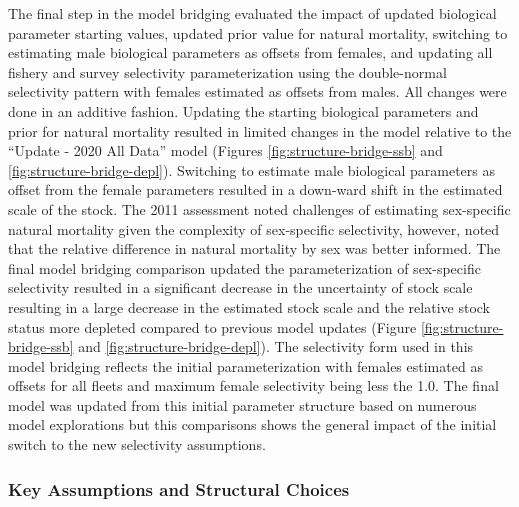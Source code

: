 \documentclass[11pt,
  english,
  a4paper,
]{article}
\begin{document}
The final step in the model bridging evaluated the impact of updated biological parameter starting values, updated prior value for natural mortality, switching to estimating male biological parameters as offsets from females, and updating all fishery and survey selectivity parameterization using the double-normal selectivity pattern with females estimated as offsets from males. All changes were done in an additive fashion. Updating the starting biological parameters and prior for natural mortality resulted in limited changes in the model relative to the ``Update - 2020 All Data'' model (Figures \ref{fig:structure-bridge-ssb} and \ref{fig:structure-bridge-depl}). Switching to estimate male biological parameters as offset from the female parameters resulted in a down-ward shift in the estimated scale of the stock. The 2011 assessment noted challenges of estimating sex-specific natural mortality given the complexity of sex-specific selectivity, however, noted that the relative difference in natural mortality by sex was better informed. The final model bridging comparison updated the parameterization of sex-specific selectivity resulted in a significant decrease in the uncertainty of stock scale resulting in a large decrease in the estimated stock scale and the relative stock status more depleted compared to previous model updates (Figure \ref{fig:structure-bridge-ssb} and \ref{fig:structure-bridge-depl}). The selectivity form used in this model bridging reflects the initial parameterization with females estimated as offsets for all fleets and maximum female selectivity being less the 1.0. The final model was updated from this initial parameter structure based on numerous model explorations but this comparisons shows the general impact of the initial switch to the new selectivity assumptions.

\leavevmode\tagmcend\tagstructend\par


\hypertarget{key-assumptions-and-structural-choices}{%
\subsubsection{Key Assumptions and Structural Choices}\label{key-assumptions-and-structural-choices}}

\leavevmode\tagmcend\tagstructend

\end{document}
